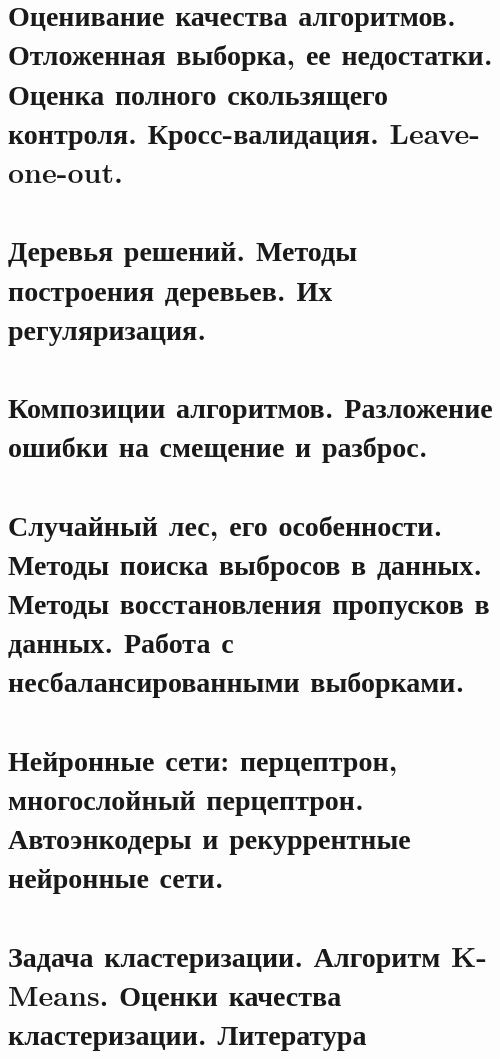 \begin{multicols}{2}
    \section{Оценивание качества алгоритмов. Отложенная выборка, ее недостатки. Оценка полного
    скользящего контроля. Кросс-валидация. Leave-one-out.}

    \section{Деревья решений. Методы построения деревьев. Их регуляризация.}

    \section{Композиции алгоритмов. Разложение ошибки на смещение и разброс.}
    \columnbreak
    \section{Случайный лес, его особенности. Методы поиска выбросов в данных. Методы
    восстановления пропусков в данных. Работа с несбалансированными выборками.}

    \section{Нейронные сети: перцептрон, многослойный перцептрон. Автоэнкодеры и
    рекуррентные нейронные сети.}

    \section{Задача кластеризации. Алгоритм K-Means. Оценки качества кластеризации.
    Литература
    }
\end{multicols}